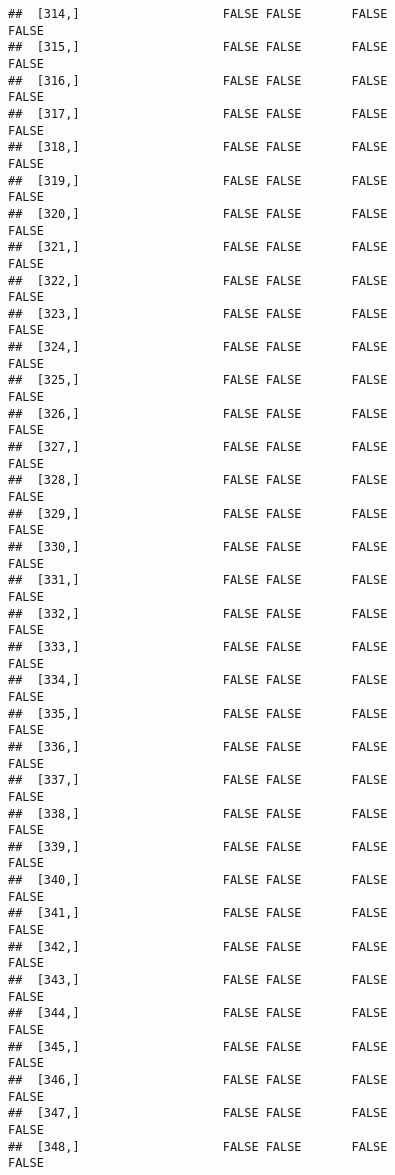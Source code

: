 \documentclass[
]{article}
\begin{document}
\begin{verbatim}
##  [314,]                    FALSE FALSE       FALSE                FALSE
##  [315,]                    FALSE FALSE       FALSE                FALSE
##  [316,]                    FALSE FALSE       FALSE                FALSE
##  [317,]                    FALSE FALSE       FALSE                FALSE
##  [318,]                    FALSE FALSE       FALSE                FALSE
##  [319,]                    FALSE FALSE       FALSE                FALSE
##  [320,]                    FALSE FALSE       FALSE                FALSE
##  [321,]                    FALSE FALSE       FALSE                FALSE
##  [322,]                    FALSE FALSE       FALSE                FALSE
##  [323,]                    FALSE FALSE       FALSE                FALSE
##  [324,]                    FALSE FALSE       FALSE                FALSE
##  [325,]                    FALSE FALSE       FALSE                FALSE
##  [326,]                    FALSE FALSE       FALSE                FALSE
##  [327,]                    FALSE FALSE       FALSE                FALSE
##  [328,]                    FALSE FALSE       FALSE                FALSE
##  [329,]                    FALSE FALSE       FALSE                FALSE
##  [330,]                    FALSE FALSE       FALSE                FALSE
##  [331,]                    FALSE FALSE       FALSE                FALSE
##  [332,]                    FALSE FALSE       FALSE                FALSE
##  [333,]                    FALSE FALSE       FALSE                FALSE
##  [334,]                    FALSE FALSE       FALSE                FALSE
##  [335,]                    FALSE FALSE       FALSE                FALSE
##  [336,]                    FALSE FALSE       FALSE                FALSE
##  [337,]                    FALSE FALSE       FALSE                FALSE
##  [338,]                    FALSE FALSE       FALSE                FALSE
##  [339,]                    FALSE FALSE       FALSE                FALSE
##  [340,]                    FALSE FALSE       FALSE                FALSE
##  [341,]                    FALSE FALSE       FALSE                FALSE
##  [342,]                    FALSE FALSE       FALSE                FALSE
##  [343,]                    FALSE FALSE       FALSE                FALSE
##  [344,]                    FALSE FALSE       FALSE                FALSE
##  [345,]                    FALSE FALSE       FALSE                FALSE
##  [346,]                    FALSE FALSE       FALSE                FALSE
##  [347,]                    FALSE FALSE       FALSE                FALSE
##  [348,]                    FALSE FALSE       FALSE                FALSE

\end{verbatim}
\end{document}
